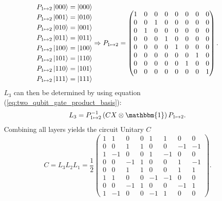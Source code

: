 	\begin{equation}
		\label{eq:example_circuit_permutation_matrix}
		\begin{split}
			P_{1\mapsto 2}\ket{000}&=\ket{000} \\
			P_{1\mapsto 2}\ket{001}&=\ket{010} \\
			P_{1\mapsto 2}\ket{010}&=\ket{001} \\
			P_{1\mapsto 2}\ket{011}&=\ket{011} \\
			P_{1\mapsto 2}\ket{100}&=\ket{100} \\
			P_{1\mapsto 2}\ket{101}&=\ket{110} \\
			P_{1\mapsto 2}\ket{110}&=\ket{101} \\
			P_{1\mapsto 2}\ket{111}&=\ket{111}
		\end{split} \Rightarrow P_{1\mapsto 2}=
		\begin{pmatrix}
			1 & 0 & 0 & 0 & 0 & 0 & 0 & 0 \\
			0 & 0 & 1 & 0 & 0 & 0 & 0 & 0 \\
			0 & 1 & 0 & 0 & 0 & 0 & 0 & 0 \\
			0 & 0 & 0 & 1 & 0 & 0 & 0 & 0 \\
			0 & 0 & 0 & 0 & 1 & 0 & 0 & 0 \\
			0 & 0 & 0 & 0 & 0 & 0 & 1 & 0 \\
			0 & 0 & 0 & 0 & 0 & 1 & 0 & 0 \\
			0 & 0 & 0 & 0 & 0 & 0 & 0 & 1 
		\end{pmatrix}.
	\end{equation}
	$L_3$ can then be determined by using equation (\ref{eq:two_qubit_gate_product_basis}):
	\begin{equation}
		\label{eq:example_circuit_layer3}
		L_3=P^{-1}_{1\mapsto 2}\left(CX\otimes \mathbbm{1}\right)P_{1\mapsto 2}.
	\end{equation}
	Combining all layers yields the circuit Unitary $C$
	\begin{equation}
		\label{eq:example_circuit_unitary}
		C=L_3L_2L_1=\frac{1}{2}
		\begin{pmatrix}
			1 & 1 & 0 & 0 & 1 & 1 & 0 & 0 \\
			0 & 0 & 1 & 1 & 0 & 0 & -1 & -1 \\
			1 & -1 & 0 & 0 & 1 & -1 & 0 & 0 \\
			0 & 0 & -1 & 1 & 0 & 0 & 1 & -1 \\
			0 & 0 & 1 & 1 & 0 & 0 & 1 & 1 \\
			1 & 1 & 0 & 0 & -1 & -1 & 0 & 0 \\
			0 & 0 & -1 & 1 & 0 & 0 & -1 & 1 \\
			1 & -1 & 0 & 0 & -1 & 1 & 0 & 0
		\end{pmatrix}.
	\end{equation}
